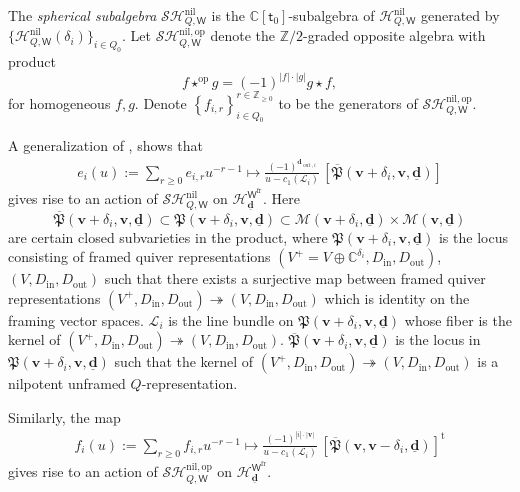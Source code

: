 \documentclass[10pt]{amsart}
\theoremstyle{definition}
\numberwithin{equation}{section}
\newcommand{\bC}{\mathbb{C}}
\newcommand{\bZ}{\mathbb{Z}}
\newcommand{\bv}{\mathbf{v}}
\newcommand{\bd}{\mathbf{d}}
\newcommand{\cM}{\mathcal{M}}
\newcommand{\sW}{\mathsf{W}}
\newcommand{\In}{\operatorname{in}}
\newcommand{\Out}{\operatorname{out}}
\begin{document}
The \textit{spherical subalgebra}
$\mathcal{SH}^{\mathrm{nil}}_{Q,\sW}$ is the $\bC[\mathsf t_0]$-subalgebra of $\mathcal{H}^{\mathrm{nil}}_{Q,\sW}$ generated by $\{\mathcal{H}^{\mathrm{nil}}_{Q,\sW}(\delta_i)\}_{i\in Q_0}$.
Let $\mathcal{SH}^{\mathrm{nil},\mathrm{op}}_{Q,\sW}$ denote the $\bZ/2$-graded opposite algebra with product 
$$f\star^{\mathrm{op}}g=(-1)^{|f|\cdot |g|}g\star f,$$ for homogeneous $f,g$. Denote $\left\{f_{i,r}\right\}_{i\in Q_0}^{r\in \bZ_{\geqslant 0}}$ to be the generators of $\mathcal{SH}^{\mathrm{nil},\mathrm{op}}_{Q,\sW}$.

A generalization of \cite[Prop. 3.4]{VV2}, \cite{Nak1} shows that 
\begin{align}\label{sph coha act}
    e_i(u):=\sum_{r\geqslant 0}e_{i,r}u^{-r-1}\mapsto \frac{(-1)^{\bd_{\Out,i}}}{u-c_1(\mathcal L_i)}\,[\overline{\mathfrak{P}}(\bv+\delta_i,\bv,\underline{\bd})]
\end{align}
gives rise to an action of $\mathcal{SH}^{\mathrm{nil}}_{Q,\sW}$ on $\mathcal H_{\underline{\bd}}^{\sW^{\mathrm{fr}}}$. Here 
$$\overline{\mathfrak{P}}(\bv+\delta_i,\bv,\underline{\bd})\subset {\mathfrak{P}}(\bv+\delta_i,\bv,\underline{\bd})
\subset \cM(\bv+\delta_i,\underline{\bd})\times \cM(\bv,\underline{\bd})$$ are certain closed subvarieties in the product, where ${\mathfrak{P}}(\bv+\delta_i,\bv,\underline{\bd})$ is the locus consisting of framed quiver representations $(V^+=V\oplus\bC^{\delta_i},D_{\In },D_{\Out})$, $(V,D_{\In },D_{\Out})$ such that there exists a surjective map between framed quiver representations $(V^+,D_{\In },D_{\Out})\twoheadrightarrow(V,D_{\In },D_{\Out})$ which is identity on the framing vector spaces. $\mathcal L_i$ is the line bundle on ${\mathfrak{P}}(\bv+\delta_i,\bv,\underline{\bd})$ whose fiber is the kernel of $(V^+,D_{\In },D_{\Out})\twoheadrightarrow(V,D_{\In },D_{\Out})$. $\overline{\mathfrak{P}}(\bv+\delta_i,\bv,\underline{\bd})$ is the locus in ${\mathfrak{P}}(\bv+\delta_i,\bv,\underline{\bd})$ such that the kernel of $(V^+,D_{\In },D_{\Out})\twoheadrightarrow(V,D_{\In },D_{\Out})$ is a nilpotent unframed $Q$-representation.

Similarly, the map 
\begin{align}\label{sph coha op act}
    f_i(u):=\sum_{r\geqslant 0}f_{i,r}u^{-r-1}\mapsto \frac{(-1)^{|i|\cdot |\bv|}}{u-c_1(\mathcal L_i)}\,[\overline{\mathfrak{P}}(\bv,\bv-\delta_i,\underline{\bd})]^{\mathrm{t}}
\end{align}
gives rise to an action of $\mathcal{SH}^{\mathrm{nil},\mathrm{op}}_{Q,\sW}$ on $\mathcal H_{\underline{\bd}}^{\sW^{\mathrm{fr}}}$. 
\end{document}
